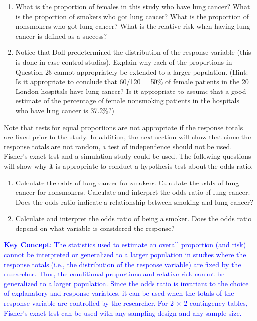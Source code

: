 \documentclass[
]{report}
\begin{document}
\begin{enumerate}
\def\labelenumi{\arabic{enumi}.}
\setcounter{enumi}{27}
\item
  What is the proportion of females in this study who have lung cancer? What is the proportion of smokers who got lung cancer? What is the proportion of nonsmokers who got lung cancer? What is the relative risk when having lung cancer is defined as a success?
\item
  Notice that Doll predetermined the distribution of the response variable (this is done in case‑control studies). Explain why each of the proportions in Question 28 cannot appropriately be extended to a larger population. (Hint: Is it appropriate to conclude that 60/120 = 50\% of female patients in the 20 London hospitals have lung cancer? Is it appropriate to assume that a good estimate of the percentage of female nonsmoking patients in the hospitals who have lung cancer is 37.2\%?)
\end{enumerate}

Note that tests for equal proportions are not appropriate if the response totals are fixed prior to the study. In addition, the next section will show that since the response totals are not random, a test of independence should not be used. Fisher's exact test and a simulation study could be used. The following questions will show why it is appropriate to conduct a hypothesis test about the odds ratio.

\begin{enumerate}
\def\labelenumi{\arabic{enumi}.}
\setcounter{enumi}{29}
\item
  Calculate the odds of lung cancer for smokers. Calculate the odds of lung cancer for nonsmokers. Calculate and interpret the odds ratio of lung cancer. Does the odds ratio indicate a relationship between smoking and lung cancer?
\item
  Calculate and interpret the odds ratio of being a smoker. Does the odds ratio depend on what variable is considered the response?
\end{enumerate}

\textbf{\textcolor{blue}{Key Concept:}}
\textcolor{blue}{The statistics used to estimate an overall proportion (and risk) cannot be interpreted or generalized to a larger population in studies where the response totals (i.e., the distribution of the response variable) are fixed by the researcher. Thus, the conditional proportions and relative risk cannot be generalized to a larger population. Since the odds ratio is invariant to the choice of explanatory and response variables, it can be used when the totals of the response variable are controlled by the researcher. For 2 × 2 contingency tables, Fisher’s exact test can be used with any sampling design and any sample size.}
\end{document}
